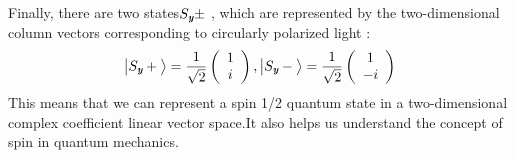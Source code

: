 \documentclass[a4paper]{article}
\def\mathbi#1{\textbf{\em #1}}
\newcommand{\ket}[1]{\big|  #1 \big \rangle }
\begin{document}
Finally, there are two states$\textbf{$S_{\mathbi{y}}$}\pm$ , which are represented by the two-dimensional column vectors corresponding to circularly polarized light\cite{sakurai1995modern} :
\begin{equation}
\ket{\textbf{$S_{\mathbi{y}}$}+}=\frac{1}{\sqrt{2}}\left( \begin{array}{c} 1 \\ i \end{array} \right),
                           \ket{\textbf{$S_{\mathbi{y}}$}-}=\frac{1}{\sqrt{2}}\left(                     \begin{array}{c} 1 \\ -i \end{array} \right)
\end{equation}
This means that we can represent a spin 1/2 quantum state in a two-dimensional complex coefficient linear vector space.It also helps us understand the concept of spin in quantum mechanics.










\end{document}
